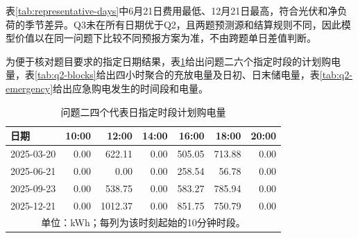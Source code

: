 \documentclass[UTF8,12pt,a4paper]{ctexart}
\theoremstyle{remark}
\begin{document}
表\ref{tab:representative-days}中6月21日费用最低、12月21日最高，符合光伏和净负荷的季节差异。Q3未在所有日期优于Q2，且两题预测源和结算规则不同，因此模型价值以在同一问题下比较不同预报方案为准，不由跨题单日差值判断。

为便于核对题目要求的指定日期结果，表\ref{tab:q2-selected}给出问题二六个指定时段的计划购电量，表\ref{tab:q2-blocks}给出四小时聚合的充放电量及日初、日末储电量，表\ref{tab:q2-emergency}给出应急购电发生的时间段和电量。
\begin{table}[H]\centering\scriptsize
\caption{问题二四个代表日指定时段计划购电量}\label{tab:q2-selected}
\begin{tabular}{lrrrrrr}\toprule 日期&10:00&12:00&14:00&16:00&18:00&20:00\\\midrule
2025-03-20&0.00&622.11&0.00&505.05&713.88&0.00\\
2025-06-21&0.00&0.00&0.00&258.54&56.78&0.00\\
2025-09-23&0.00&538.75&0.00&583.27&785.94&0.00\\
2025-12-21&0.00&1012.37&0.00&851.75&750.79&0.00\\\bottomrule
\multicolumn{7}{c}{单位：kWh；每列为该时刻起始的10分钟时段。}\end{tabular}\end{table}
\end{document}
